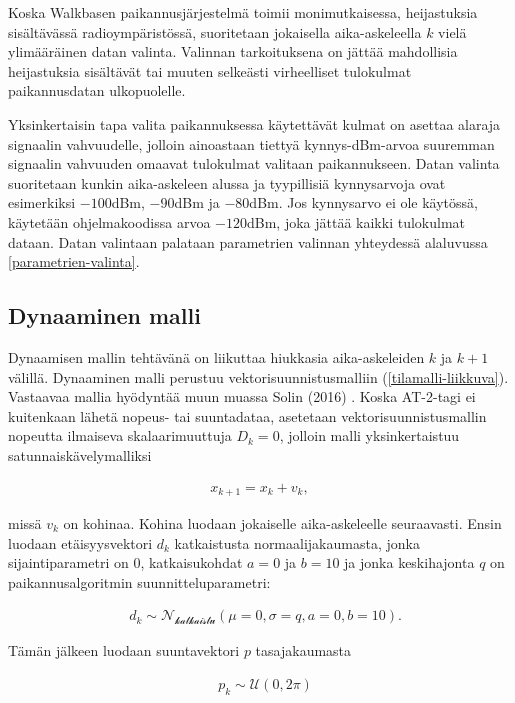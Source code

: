\documentclass[
  12pt,
  a4paper, twoside]{book}
\begin{document}
Koska Walkbasen paikannusjärjestelmä toimii monimutkaisessa, heijastuksia sisältävässä radioympäristössä, suoritetaan jokaisella aika-askeleella \(k\) vielä ylimääräinen datan valinta. Valinnan tarkoituksena on jättää mahdollisia heijastuksia sisältävät tai muuten selkeästi virheelliset tulokulmat paikannusdatan ulkopuolelle.

Yksinkertaisin tapa valita paikannuksessa käytettävät kulmat on asettaa alaraja signaalin vahvuudelle, jolloin ainoastaan tiettyä kynnys-dBm-arvoa suuremman signaalin vahvuuden omaavat tulokulmat valitaan paikannukseen. Datan valinta suoritetaan kunkin aika-askeleen alussa ja tyypillisiä kynnysarvoja ovat esimerkiksi \(-100\)dBm, \(-90\)dBm ja \(-80\)dBm. Jos kynnysarvo ei ole käytössä, käytetään ohjelmakoodissa arvoa \(-120\)dBm, joka jättää kaikki tulokulmat dataan. Datan valintaan palataan parametrien valinnan yhteydessä alaluvussa \ref{parametrien-valinta}.

\subsection{Dynaaminen malli}\label{dynaaminen-malli}

Dynaamisen mallin tehtävänä on liikuttaa hiukkasia aika-askeleiden \(k\) ja \(k+1\) välillä. Dynaaminen malli perustuu vektorisuunnistusmalliin (\ref{tilamalli-liikkuva}). Vastaavaa mallia hyödyntää muun muassa Solin (2016) \citep{Solin-2016}. Koska AT-2-tagi ei kuitenkaan lähetä nopeus- tai suuntadataa, asetetaan vektorisuunnistusmallin nopeutta ilmaiseva skalaarimuuttuja \(D_k=0\), jolloin malli yksinkertaistuu satunnaiskävelymalliksi

\begin{align}\label{dynaaminen-malli-empiirinen}
x_{k+1}=x_k + v_k,
\end{align}

\noindent missä \(v_k\) on kohinaa. Kohina luodaan jokaiselle aika-askeleelle seuraavasti. Ensin luodaan etäisyysvektori \(d_k\) katkaistusta normaalijakaumasta, jonka sijaintiparametri on 0, katkaisukohdat \(a=0\) ja \(b=10\) ja jonka keskihajonta \(q\) on paikannusalgoritmin suunnitteluparametri:

\begin{align}
&d_k \sim \mathcal{N_{\text{katkaistu}}}(\mu=0, \sigma=q, a=0, b=10).
\end{align}

Tämän jälkeen luodaan suuntavektori \(p\) tasajakaumasta

\begin{align}
&p_k\sim\mathcal{U}(0, 2 \pi)
\end{align}
\end{document}
